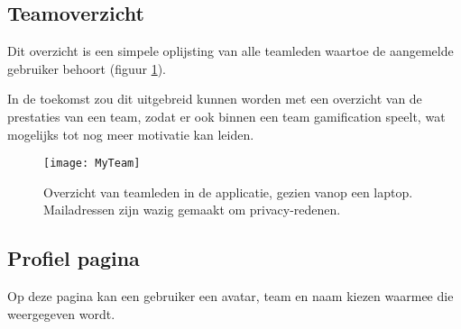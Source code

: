 \subsection{Teamoverzicht}

Dit overzicht is een simpele oplijsting van alle teamleden waartoe de aangemelde gebruiker behoort (figuur \ref{fig:team}).

In de toekomst zou dit uitgebreid kunnen worden met een overzicht van de prestaties van een team, zodat er ook binnen een team gamification speelt, wat mogelijks tot nog meer motivatie kan leiden.

\begin{figure}[h]
    \caption[Overzicht van teamleden]{Overzicht van teamleden in de applicatie, gezien vanop een laptop. Mailadressen zijn wazig gemaakt om privacy-redenen.}
    \texttt{[image: MyTeam]}
    \label{fig:team}
\end{figure}

\subsection{Profiel pagina}

Op deze pagina kan een gebruiker een avatar, team en naam kiezen waarmee die weergegeven wordt.